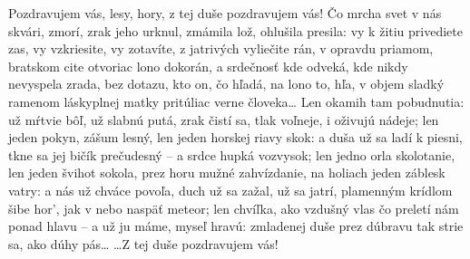 Pozdravujem vás, lesy, hory,
z tej duše pozdravujem vás!
Čo mrcha svet v nás skvári, zmorí,
zrak jeho urknul, zmámila
lož, ohlušila presila:
vy k žitiu privediete zas,
vy vzkriesite, vy zotavíte,
z jatrivých vyliečite rán,
v opravdu priamom, bratskom cite
otvoriac lono dokorán,
a srdečnosť kde odveká,
kde nikdy nevyspela zrada,
bez dotazu, kto on, čo hľadá,
na lono to, hľa, v objem sladký
ramenom láskyplnej matky
pritúliac verne človeka\dots
Len okamih tam pobudnutia:
už mŕtvie bôľ, už slabnú putá,
zrak čistí sa, tlak voľneje,
i oživujú nádeje;
len jeden pokyn, zášum lesný,
len jeden horskej riavy skok:
a duša už sa ladí k piesni,
tkne sa jej bičík prečudesný --
a srdce hupká vozvysok;
len jedno orla skolotanie,
len jeden švihot sokola,
prez horu mužné zahvízdanie,
na holiach jeden záblesk vatry:
a nás už chváce povoľa,
duch už sa zažal, už sa jatrí,
plamenným krídlom šibe hor’,
jak v nebo naspäť meteor;
len chvíľka, ako vzdušný vlas
čo preletí nám ponad hlavu --
a už ju máme, myseľ hravú:
zmladenej duše prez dúbravu
tak strie sa, ako dúhy pás\dots
\dots Z tej duše pozdravujem vás!

